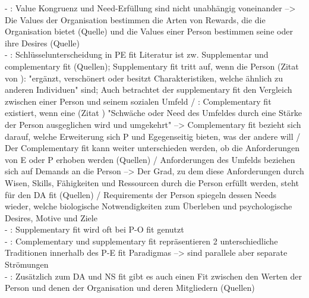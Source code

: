 - \cite[S. 3]{edwards:2004}: Value Kongruenz und Need-Erfüllung sind nicht unabhängig voneinander --> Die Values der Organisation bestimmen die Arten von Rewards, die die Organisation bietet (Quelle) und die Values einer Person bestimmen seine oder ihre Desires (Quelle) \\
- \cite[S. 3]{edwards:2007}: Schlüsselunterscheidung in PE fit Literatur ist zw. Supplementar und complementary fit (Quellen); Supplementary fit tritt auf, wenn die Person (Zitat von \textcite[S. 269]{muchinsky:1987}): "ergänzt, verschönert oder besitzt Charakteristiken, welche ähnlich zu anderen Individuen" sind; Auch betrachtet der supplementary fit den Vergleich zwischen einer Person und seinem sozialen Umfeld / \cite[S. 4]{edwards:2007}: Complementary fit existiert, wenn eine (Zitat \cite[S. 271]{muchinsky:1987}) "Schwäche oder Need des Umfeldes durch eine Stärke der Person ausgeglichen wird und umgekehrt" --> Complementary fit bezieht sich darauf, welche Erweiterung sich P und Egegenseitig bieten, was der andere will / Der Complementary fit kann weiter unterschieden werden, ob die Anforderungen von E oder P erhoben werden (Quellen) / Anforderungen des Umfelds beziehen sich auf Demands an die Person --> Der Grad, zu dem diese Anforderungen durch Wisen, Skills, Fähigkeiten und Ressourcen durch die Person erfüllt werden, steht für den DA fit (Quellen) / Requirements der Person spiegeln dessen Needs wieder, welche biologische Notwendigkeiten zum Überleben und psychologische Desires, Motive und Ziele \cite{copingAndAdaption:1974} \\
- \cite[S. 6]{edwards:2007}: Supplementary fit wird oft bei P-O fit genutzt \\
- \cite[S. 1]{edwards:2004}: Complementary und supplementary fit repräsentieren 2 unterschiedliche Traditionen innerhalb des P-E fit Paradigmas --> sind parallele aber separate Strömungen \\
- \cite[S. 1]{edwards:2007}: Zusätzlich zum DA und NS fit gibt es auch einen Fit zwischen den Werten der Person und denen der Organisation und deren Mitgliedern (Quellen) \\

